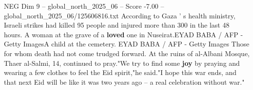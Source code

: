 \begin{textsample}{NEG Dim 9 – global\_north\_2025\_06 – Score -7.00 – global\_north\_2025\_06/125606816.txt}
According to Gaza ' s health ministry, Israeli strikes had killed 95 people and injured more than 300 in the last 48 hours.
A woman at the grave of a \textbf{loved} one in Nuseirat.EYAD BABA / AFP - Getty ImagesA child at the cemetery.
EYAD BABA / AFP - Getty Images Those for whom death had not come trudged forward.
At the ruins of al-Albani Mosque, Thaer al-Salmi, 14, continued to pray."We try to find some \textbf{joy} by praying and wearing a few clothes to feel the Eid spirit,"he said."I hope this war ends, and that next Eid will be like it was two years ago -- a real celebration without war."

\end{textsample}

